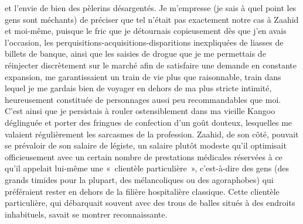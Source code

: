 et l’envie de bien des pèlerins désargentés. Je m’empresse (je sais à quel point les gens sont méchants) de préciser que tel n’était pas exactement notre cas à Zaahid et moi-même, puisque le fric que je détournais copieusement dès que j’en avais l’occasion, les perquisitions-acquisitions-disparitions inexpliquées de liasses de billets de banque, ainsi que les saisies de drogue que je me permettais de réinjecter discrètement sur le marché afin de satisfaire une demande en constante expansion, me garantissaient un train de vie plus que raisonnable, train dans lequel je me gardais bien de voyager en dehors de ma plus stricte intimité, heureusement constituée de personnages aussi peu recommandables que moi. C’est ainsi que je persistais à rouler ostensiblement dans ma vieille Kangoo déglinguée et porter des fringues de confection d’un goût douteux, lesquelles me valaient régulièrement les sarcasmes de la profession. Zaahid, de son côté, pouvait se prévaloir de son salaire de légiste, un salaire plutôt modeste qu’il optimisait officieusement avec un certain nombre de prestations médicales réservées à ce qu’il appelait lui-même une «~clientèle particulière~», c’est-à-dire des gens (des grands timides pour la plupart, des mélancoliques ou des agoraphobes) qui préféraient rester en dehors de la filière hospitalière classique. Cette clientèle particulière, qui débarquait souvent avec des trous de balles situés à des endroits inhabituels, savait se montrer reconnaissante.

%
